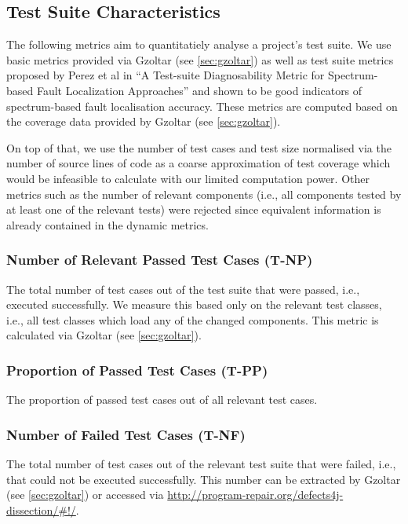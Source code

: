 \subsection{Test Suite Characteristics}

The following metrics aim to quantitatiely analyse a project's test suite. We
use basic metrics provided via Gzoltar (see \ref{sec:gzoltar}) as well as test
suite metrics proposed by Perez et al in \enquote{A Test-suite Diagnosability
Metric for Spectrum-based Fault Localization Approaches} and shown to be good
indicators of spectrum-based fault localisation accuracy. These metrics are
computed based on the coverage data provided by Gzoltar (see \ref{sec:gzoltar}). 

On top of that, we use the number of test cases and test size normalised via the number of source lines of code as a coarse approximation of test coverage which would be infeasible to calculate with our limited computation power. Other metrics such as the number of relevant components (i.e., all components tested by at least one of the relevant tests) were rejected since equivalent information is already contained in the dynamic metrics.

\subsubsection{Number of Relevant Passed Test Cases (T-NP)}

The total number of test cases out of the test suite that were passed, i.e.,
executed successfully. We measure this based only on the relevant test classes, i.e., all test classes which load any of the changed components. This metric is calculated via Gzoltar (see \ref{sec:gzoltar}).

\subsubsection{Proportion of Passed Test Cases (T-PP)}

The proportion of passed test cases out of all relevant test cases.

\subsubsection{Number of Failed Test Cases (T-NF)}

The total number of test cases out of the relevant test suite that were failed, i.e.,
that could not be executed successfully. This number can be extracted by Gzoltar
(see \ref{sec:gzoltar}) or accessed via
\url{http://program-repair.org/defects4j-dissection/#!/}.

